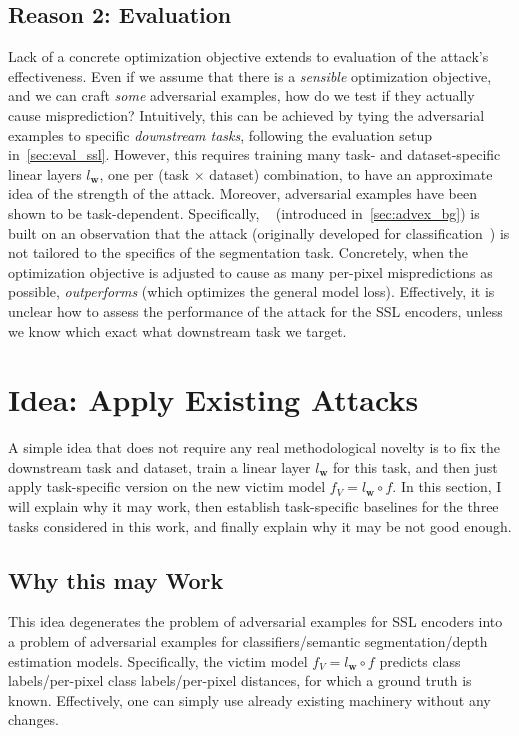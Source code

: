 \subsection{Reason 2: Evaluation}

Lack of a concrete optimization objective extends to evaluation of the attack's effectiveness. Even if we assume that there is a \textit{sensible} optimization objective, and we can craft \textit{some} adversarial examples, how do we test if they actually cause misprediction? Intuitively, this can be achieved by tying the adversarial examples to specific \textit{downstream tasks}, following the evaluation setup in~\cref{sec:eval_ssl}. However, this requires training many task- and dataset-specific linear layers $l_\mathbf{w}$, one per (task $\times$ dataset) combination, to have an approximate idea of the strength of the attack. Moreover, adversarial examples have been shown to be task-dependent. Specifically, \SegPGD~\cite{segpgd} (introduced in~\cref{sec:advex_bg}) is built on an observation that the \PGD attack (originally developed for classification~\cite{pgd}) is not tailored to the specifics of the segmentation task. Concretely, when the optimization objective is adjusted to cause as many per-pixel mispredictions as possible, \SegPGD \textit{outperforms} \PGD (which optimizes the general model loss). Effectively, it is unclear how to assess the performance of the attack for the SSL encoders, unless we know which exact what downstream task we target.

\section{Idea: Apply Existing Attacks}\label{sec:pgd_baselines}

A simple idea that does not require any real methodological novelty is to fix the downstream task and dataset, train a linear layer $l_\mathbf{w}$ for this task, and then just apply task-specific \PGD version on the new victim model $f_V=l_\mathbf{w}\circ f$. In this section, I will explain why it may work, then establish task-specific baselines for the three tasks considered in this work, and finally explain why it may be not good enough.

\subsection{Why this may Work}

This idea degenerates the problem of adversarial examples for SSL encoders into a problem of adversarial examples for classifiers/semantic segmentation/depth estimation models. Specifically, the victim model $f_V=l_\mathbf{w}\circ f$ predicts class labels/per-pixel class labels/per-pixel distances, for which a ground truth is known. Effectively, one can simply use already existing machinery without any changes. 

